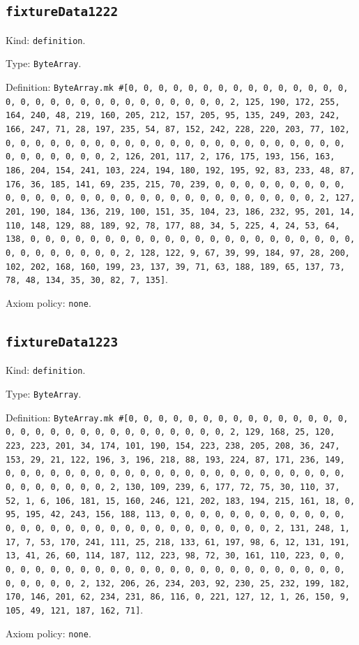 \documentclass[11pt]{article}
\begin{document}
\subsection*{\texttt{fixtureData1222}}
\noindent Kind: \texttt{definition}.\par
\noindent Type: \texttt{ByteArray}.\par
\noindent Definition: \texttt{ByteArray.mk \#[0, 0, 0, 0, 0, 0, 0, 0, 0, 0, 0, 0, 0, 0, 0, 0, 0, 0, 0, 0, 0, 0, 0, 0, 0, 0, 0, 0, 0, 0, 2, 125, 190, 172, 255, 164, 240, 48, 219, 160, 205, 212, 157, 205, 95, 135, 249, 203, 242, 166, 247, 71, 28, 197, 235, 54, 87, 152, 242, 228, 220, 203, 77, 102, 0, 0, 0, 0, 0, 0, 0, 0, 0, 0, 0, 0, 0, 0, 0, 0, 0, 0, 0, 0, 0, 0, 0, 0, 0, 0, 0, 0, 0, 0, 2, 126, 201, 117, 2, 176, 175, 193, 156, 163, 186, 204, 154, 241, 103, 224, 194, 180, 192, 195, 92, 83, 233, 48, 87, 176, 36, 185, 141, 69, 235, 215, 70, 239, 0, 0, 0, 0, 0, 0, 0, 0, 0, 0, 0, 0, 0, 0, 0, 0, 0, 0, 0, 0, 0, 0, 0, 0, 0, 0, 0, 0, 0, 0, 2, 127, 201, 190, 184, 136, 219, 100, 151, 35, 104, 23, 186, 232, 95, 201, 14, 110, 148, 129, 88, 189, 92, 78, 177, 88, 34, 5, 225, 4, 24, 53, 64, 138, 0, 0, 0, 0, 0, 0, 0, 0, 0, 0, 0, 0, 0, 0, 0, 0, 0, 0, 0, 0, 0, 0, 0, 0, 0, 0, 0, 0, 0, 0, 2, 128, 122, 9, 67, 39, 99, 184, 97, 28, 200, 102, 202, 168, 160, 199, 23, 137, 39, 71, 63, 188, 189, 65, 137, 73, 78, 48, 134, 35, 30, 82, 7, 135]}.\par
\noindent Axiom policy: \texttt{none}.\par
\subsection*{\texttt{fixtureData1223}}
\noindent Kind: \texttt{definition}.\par
\noindent Type: \texttt{ByteArray}.\par
\noindent Definition: \texttt{ByteArray.mk \#[0, 0, 0, 0, 0, 0, 0, 0, 0, 0, 0, 0, 0, 0, 0, 0, 0, 0, 0, 0, 0, 0, 0, 0, 0, 0, 0, 0, 0, 0, 2, 129, 168, 25, 120, 223, 223, 201, 34, 174, 101, 190, 154, 223, 238, 205, 208, 36, 247, 153, 29, 21, 122, 196, 3, 196, 218, 88, 193, 224, 87, 171, 236, 149, 0, 0, 0, 0, 0, 0, 0, 0, 0, 0, 0, 0, 0, 0, 0, 0, 0, 0, 0, 0, 0, 0, 0, 0, 0, 0, 0, 0, 0, 0, 2, 130, 109, 239, 6, 177, 72, 75, 30, 110, 37, 52, 1, 6, 106, 181, 15, 160, 246, 121, 202, 183, 194, 215, 161, 18, 0, 95, 195, 42, 243, 156, 188, 113, 0, 0, 0, 0, 0, 0, 0, 0, 0, 0, 0, 0, 0, 0, 0, 0, 0, 0, 0, 0, 0, 0, 0, 0, 0, 0, 0, 0, 0, 0, 2, 131, 248, 1, 17, 7, 53, 170, 241, 111, 25, 218, 133, 61, 197, 98, 6, 12, 131, 191, 13, 41, 26, 60, 114, 187, 112, 223, 98, 72, 30, 161, 110, 223, 0, 0, 0, 0, 0, 0, 0, 0, 0, 0, 0, 0, 0, 0, 0, 0, 0, 0, 0, 0, 0, 0, 0, 0, 0, 0, 0, 0, 0, 0, 2, 132, 206, 26, 234, 203, 92, 230, 25, 232, 199, 182, 170, 146, 201, 62, 234, 231, 86, 116, 0, 221, 127, 12, 1, 26, 150, 9, 105, 49, 121, 187, 162, 71]}.\par
\noindent Axiom policy: \texttt{none}.\par
\end{document}
